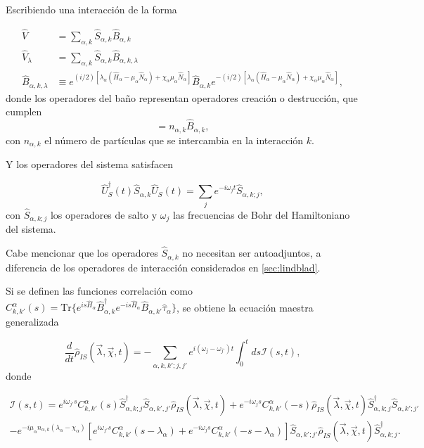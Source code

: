 Escribiendo una interacción de la forma

\begin{align*}
    \hat{V} & = \sum_{\alpha,k}\hat{S}_{\alpha,k}\hat{B}_{\alpha,k} \\
    \hat{V}_{\lambda} & = \sum_{\alpha,k}\hat{S}_{\alpha,k}\hat{B}_{\alpha,k,\lambda} \\
    \hat{B}_{\alpha,k,\lambda} & \equiv e^{(i/2)[\lambda_{\alpha}(\hat{H}_{\alpha} - \mu_{\alpha}\hat{N}_{\alpha}) + \chi_{\alpha}\mu_{\alpha}\hat{N}_{\alpha}]}\hat{B}_{\alpha,k}e^{-(i/2)[\lambda_{\alpha}(\hat{H}_{\alpha} - \mu_{\alpha}\hat{N}_{\alpha}) + \chi_{\alpha}\mu_{\alpha}\hat{N}_{\alpha}]},  
\end{align*}
donde los operadores del baño representan operadores creación o destrucción, que cumplen  
\begin{equation*}
    [\hat{B}_{\alpha,k},\hat{N}_{\alpha}] = n_{\alpha,k}\hat{B}_{\alpha,k},
\end{equation*}
con $n_{\alpha,k}$ el número de part\'iculas que se intercambia en la interacción $k$.
 
Y los operadores del sistema satisfacen

\begin{equation*}
    \hat{U}^{\dagger}_{S}(t)\hat{S}_{\alpha,k}\hat{U}_{S}(t) = \sum_{j}e^{-i\omega_{j}t}\hat{S}_{\alpha,k;j},
\end{equation*}
con $\hat{S}_{\alpha,k;j}$ los operadores de salto y $\omega_{j}$ las frecuencias de Bohr del Hamiltoniano del sistema. 

Cabe mencionar que los operadores $\hat{S}_{\alpha,k}$ no necesitan ser autoadjuntos, a diferencia de los  operadores de interacción considerados en \ref{sec:lindblad}.

Si se definen las funciones correlación como $C^{\alpha}_{k,k'}(s) = \text{Tr}\{e^{is\hat{H}_{\alpha} }\hat{B}^{\dagger}_{\alpha,k}e^{-is\hat{H}_{\alpha} }\hat{B}_{\alpha,k'}\hat{\tau}_{\alpha}\}$, se obtiene la ecuación maestra generalizada

\begin{equation}
    \frac{d}{dt}\hat{\rho}_{IS}(\vec{\lambda},\vec{\chi},t) = - \sum_{\alpha,k,k';j,j'}e^{i(\omega_{j}-\omega_{j'})t}\int_{0}^{t}ds \mathcal{I}(s,t) ,
\label{ecmaestrafinal}
\end{equation}
donde

\begin{multline}
    \mathcal{I}(s,t) = e^{i\omega_{j'}s} C^{\alpha}_{k,k'}(s)\hat{S}^{\dagger}_{\alpha,k;j}\hat{S}_{\alpha,k',j'}\hat{\rho}_{IS}(\vec{\lambda},\vec{\chi},t) + e^{-i\omega_{j}s}C^{\alpha}_{k,k'}(-s)\hat{\rho}_{IS}(\vec{\lambda},\vec{\chi},t)\hat{S}^{\dagger}_{\alpha,k;j}\hat{S}_{\alpha,k';j'} \\
    - e^{-i\mu_{\alpha}n_{\alpha,k}(\lambda_{\alpha} - \chi_{\alpha})}\left[e^{i\omega_{j'}s}C^{\alpha}_{k,k'}(s-\lambda_{\alpha}) + e^{-i\omega_{j}s}C^{\alpha}_{k,k'}(-s-\lambda_{\alpha})  \right]  \hat{S}_{\alpha,k';j'}\hat{\rho}_{IS}(\vec{\lambda},\vec{\chi},t)\hat{S}^{\dagger}_{\alpha,k;j}.
    \label{ecmaestrafinalI}
\end{multline}

